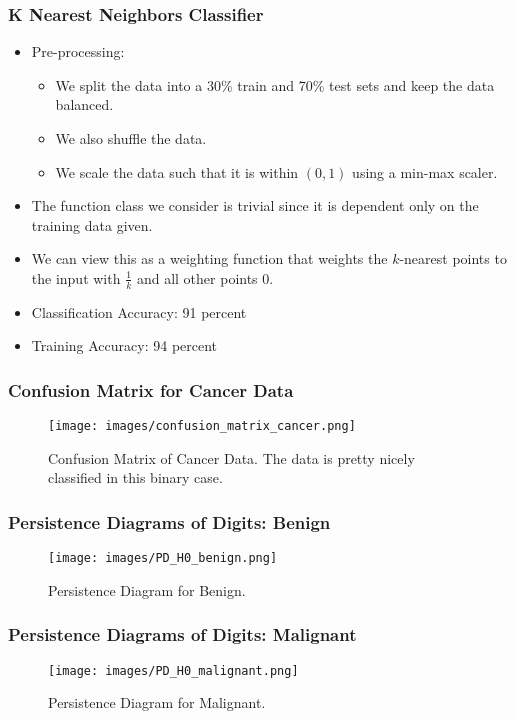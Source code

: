 		\begin{frame}
			\frametitle{K Nearest Neighbors Classifier}
			
			\begin{itemize}
				\item Pre-processing:
				\begin{itemize}
					\item We split the data into a 30\% train and 70\% test sets and keep the data balanced.
					\item We also shuffle the data.
					\item We scale the data such that it is within $(0,1)$ using a min-max scaler.
				\end{itemize}
				\item The function class we consider is trivial since it is dependent only on the training data given.
				\item We can view this as a weighting function that weights the $k$-nearest points to the input with $\frac{1}{k}$ and all other points $0$.
				\item Classification Accuracy: 91 percent
				\item Training Accuracy: 94 percent
			\end{itemize}
		\end{frame}
		
		\begin{frame}
			\frametitle{Confusion Matrix for Cancer Data}
			
			\begin{figure}
				\centering
				\texttt{[image: images/confusion\_matrix\_cancer.png]}
				\caption{Confusion Matrix of Cancer Data. The data is pretty nicely classified in this binary case.}
		\end{figure}
		\end{frame}
		
		
		
		\begin{frame}
		\frametitle{Persistence Diagrams of Digits: Benign}
		
		\begin{figure}
				\centering
				\texttt{[image: images/PD\_H0\_benign.png]}
				\caption{Persistence Diagram for Benign.}
		\end{figure}
		\end{frame}

		\begin{frame}
		\frametitle{Persistence Diagrams of Digits: Malignant}
		
		\begin{figure}
				\centering
				\texttt{[image: images/PD\_H0\_malignant.png]}
				\caption{Persistence Diagram for Malignant.}
		\end{figure}
		\end{frame}
		
